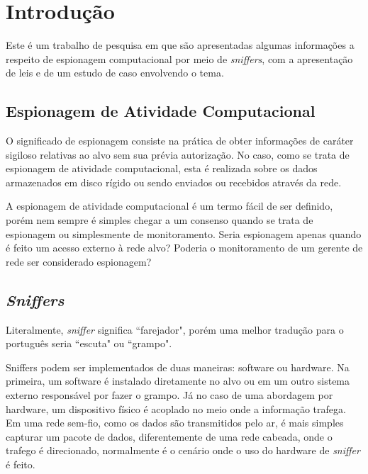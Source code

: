 \section{Introdução \label{sec:introducao}}

Este é um trabalho de pesquisa em que são apresentadas algumas informações a respeito de espionagem computacional por meio de \textit{sniffers}, com a apresentação de leis e de um estudo de caso envolvendo o tema.

\subsection{Espionagem de Atividade Computacional \label{sec:espionagem}}

O significado de espionagem consiste na prática de obter informações de caráter sigiloso relativas ao alvo sem sua prévia autorização. No caso, como se trata de espionagem de atividade computacional, esta é realizada sobre os dados armazenados em disco rígido ou sendo enviados ou recebidos através da rede.

A espionagem de atividade computacional é um termo fácil de ser definido, porém nem sempre é simples chegar a um consenso quando se trata de espionagem ou simplesmente de monitoramento. Seria espionagem apenas quando é feito um acesso externo à rede alvo? Poderia o monitoramento de um gerente de rede ser considerado espionagem?

\subsection{\textit{Sniffers} \label{sec:sniffers}}

Literalmente, \textit{sniffer} significa ``farejador", porém uma melhor tradução para o português seria ``escuta" ou ``grampo".

Sniffers podem ser implementados de duas maneiras: software ou hardware. Na primeira, um software é instalado diretamente no alvo ou em um outro sistema externo responsável por fazer o grampo. Já no caso de uma abordagem por hardware, um dispositivo físico é acoplado no meio onde a informação trafega. Em uma rede sem-fio, como os dados são transmitidos pelo ar, é mais simples capturar um pacote de dados, diferentemente de uma rede cabeada, onde o trafego é direcionado, normalmente é o cenário onde o uso do hardware de \textit{sniffer} é feito.~\cite{bib:kurose}
